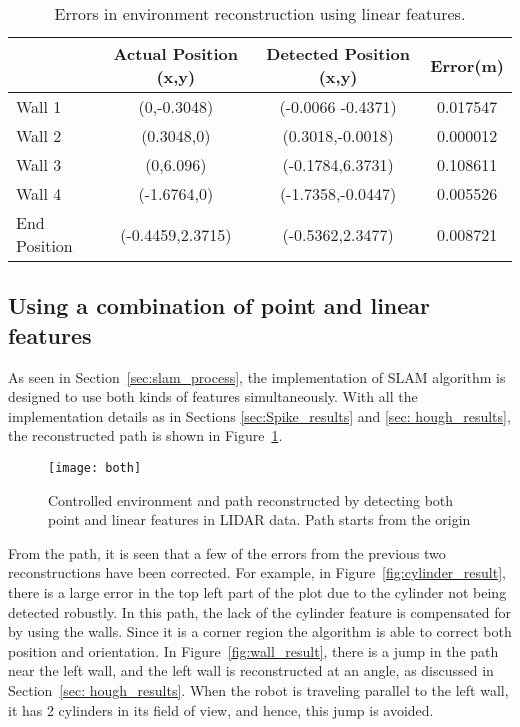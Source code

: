 \begin{table}
\caption{Errors in environment reconstruction using linear features.}
\label{tab:wall_results}
\begin{tabular}{| l | c | c | c |}
\hline ~ & Actual Position (x,y) & Detected Position (x,y) & Error(m)\\
\hline Wall 1 & (0,-0.3048) & (-0.0066 -0.4371) & 0.017547 \\ 
\hline Wall 2 & (0.3048,0) & (0.3018,-0.0018) & 0.000012 \\ 
\hline Wall 3 & (0,6.096) & (-0.1784,6.3731) & 0.108611 \\ 
\hline Wall 4 & (-1.6764,0) & (-1.7358,-0.0447) & 0.005526 \\
\hline End Position & (-0.4459,2.3715) & (-0.5362,2.3477) & 0.008721 \\
\hline 
\end{tabular} 
\end{table}

\subsection{Using a combination of point and linear features}
\label{sec:combo_result}

As seen in Section~\ref{sec:slam_process}, the implementation of SLAM algorithm is designed to use both kinds of features simultaneously. With all the implementation details as in Sections \ref{sec:Spike_results} and \ref{sec: hough_results}, the reconstructed path is shown in Figure~\ref{fig:combo_result}.

\begin{figure}
\centering
\texttt{[image: both]}
\caption{Controlled environment and path reconstructed by detecting both point and linear features in LIDAR data. Path starts from the origin}
\label{fig:combo_result}
\end{figure}


From the path, it is seen that a few of the errors from the previous two reconstructions have been corrected. For example, in Figure~\ref{fig:cylinder_result}, there is a large error in the top left part of the plot due to the cylinder not being detected robustly. In this path, the lack of the  cylinder feature is compensated for by using the walls. Since it is a corner region the algorithm is able to correct both position and orientation. In Figure~\ref{fig:wall_result}, there is a jump in the path near the left wall, and the left wall is reconstructed at an angle, as discussed in Section~\ref{sec: hough_results}. When the robot is traveling parallel to the left wall, it has 2 cylinders in its field of view, and hence, this jump is avoided.


